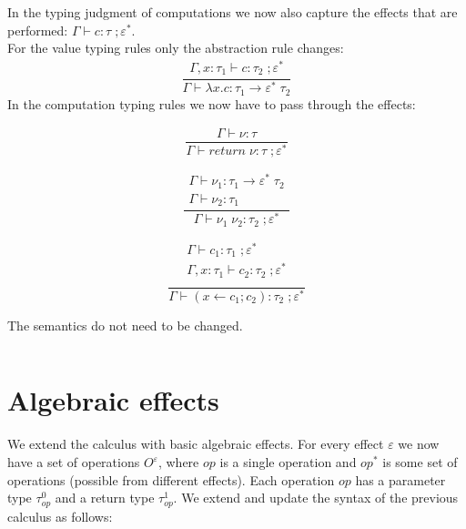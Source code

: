 \documentclass[12pt]{article}
\newcommand\eff[0]{\varepsilon}
\newcommand\effs[0]{\eff^*}
\newcommand\eop[0]{\textit{op}}
\newcommand\eopa[0]{\textit{op}^*}
\newcommand\eops[1]{O^{#1}}
\newcommand\type[0]{\tau}
\newcommand\tarre[3]{#1 \rightarrow #2 \; #3}
\newcommand\val[0]{\nu}
\newcommand\vabs[2]{\lambda #1 . #2}
\newcommand\comp[0]{c}
\newcommand\creturn[1]{\textit{return} \; #1}
\newcommand\capp[2]{#1 \; #2}
\newcommand\cdo[3]{#1 \leftarrow #2 ; #3}
\begin{document}
In the typing judgment of computations we now also capture the effects that are performed: $\Gamma \vdash \comp : \type \; ; \effs$. \\
For the value typing rules only the abstraction rule changes:
\[\frac{
	\begin{array}{l}
	\Gamma, x : \type_1 \vdash \comp : \type_2 \; ; \effs
	\end{array}
}{
	\Gamma \vdash \vabs{x}{\comp} : \tarre{\type_1}{\effs}{\type_2}
}\]
In the computation typing rules we now have to pass through the effects:
\begin{minipage}{0.33\textwidth}
\[\frac{
	\begin{array}{l}
	\Gamma \vdash \val : \type
	\end{array}
}{
	\Gamma \vdash \creturn{\val} : \type \; ; \effs
}\]
\end{minipage}
\begin{minipage}{0.33\textwidth}
\[\frac{
	\begin{array}{l}
	\Gamma \vdash \val_1 : \tarre{\type_1}{\effs}{\type_2} \\
	\Gamma \vdash \val_2 : \type_1
	\end{array}
}{
	\Gamma \vdash \capp{\val_1}{\val_2} : \type_2 \; ; \effs
}\]
\end{minipage}
\begin{minipage}{0.33\textwidth}
\[\frac{
	\begin{array}{l}
	\Gamma \vdash \comp_1 : \type_1 \; ; \effs \\
	\Gamma , x : \type_1 \vdash \comp_2 : \type_2 \; ; \effs \\
	\end{array}
}{
	\Gamma \vdash (\cdo{x}{\comp_1}{\comp_2}) : \type_2 \; ; \effs
}\]
\end{minipage}

The semantics do not need to be changed.
\newpage
\inputminted{haskell}{code2.txt}

\newpage
\section{Algebraic effects}

We extend the calculus with basic algebraic effects. For every effect $\eff$ we now have a set of operations $\eops{\eff}$, where $\eop$ is a single operation and $\eopa$ is some set of operations (possible from different effects). Each operation $\eop$ has a parameter type $\type^0_\eop$ and a return type $\type^1_\eop$. We extend and update the syntax of the previous calculus as follows:
\end{document}
